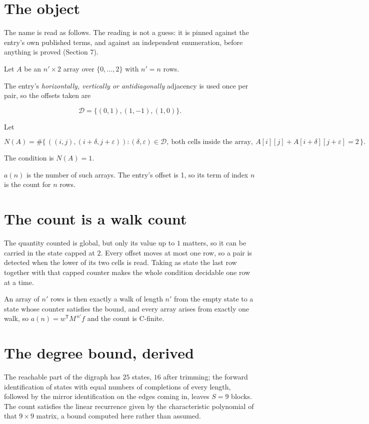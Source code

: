 \documentclass[11pt]{article}
\theoremstyle{definition}
\begin{document}
\section{The object}

The name is read as follows. The reading is not a guess: it is pinned against the entry's own published terms, and against an independent enumeration, before anything is proved (Section 7).

Let $A$ be an $n' \times 2$ array over $\{0,\dots,2\}$ with $n' = n$ rows.

The entry's {\itshape horizontally, vertically or antidiagonally} adjacency is used once per pair, so the offsets taken are

\[\mathcal{D} = \{(0,1), (1,-1), (1,0)\}.\]

Let

\[N(A) = \#\bigl\{\,((i,j),(i{+}\delta,j{+}\varepsilon)) : (\delta,\varepsilon) \in \mathcal{D},\ \text{both cells inside the array},\ A[i][j] + A[i{+}\delta][j{+}\varepsilon] = 2\,\bigr\}.\]

The condition is $N(A) = 1$.

$a(n)$ is the number of such arrays. The entry's offset is 1, so its term of index $n$ is the count for $n$ rows.

\section{The count is a walk count}

The quantity counted is global, but only its value up to $1$ matters, so it can be carried in the state capped at $2$. Every offset moves at most one row, so a pair is detected when the lower of its two cells is read. Taking as state the last row together with that capped counter makes the whole condition decidable one row at a time.

An array of $n'$ rows is then exactly a walk of length $n'$ from the empty state to a state whose counter satisfies the bound, and every array arises from exactly one walk, so $a(n) = w^{\mathsf T}M^{\,n'}f$ and the count is C-finite.

\section{The degree bound, derived}

The reachable part of the digraph has $25$ states, $16$ after trimming; the forward identification of states with equal numbers of completions of every length, followed by the mirror identification on the edges coming in, leaves $S = 9$ blocks. The count satisfies the linear recurrence given by the characteristic polynomial of that $9\times9$ matrix, a bound computed here rather than assumed.
\end{document}

